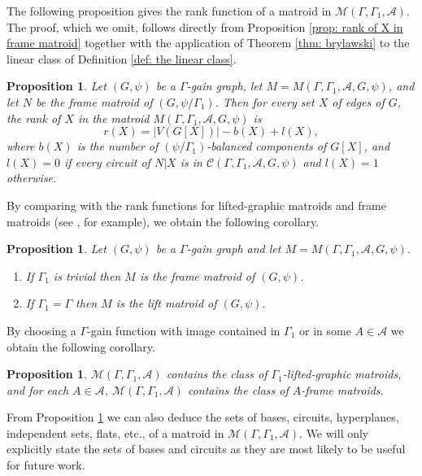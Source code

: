 \documentclass[12pt]{article}
\newtheorem{proposition}[theorem]{Proposition}
\theoremstyle{definition}
\newcommand{\cA}{\mathcal{A}}
\newcommand{\cC}{\mathcal{C}}
\newcommand{\cM}{\mathcal{M}}
\begin{document}
The following proposition gives the rank function of a matroid in $\cM(\Gamma, \Gamma_1, \cA)$.
The proof, which we omit, follows directly from Proposition \ref{prop: rank of X in frame matroid} together with the application of Theorem \ref{thm: brylawski} to the linear class of Definition \ref{def: the linear class}.


\begin{proposition} \label{prop: rank function}
Let $(G, \psi)$ be a $\Gamma$-gain graph, let $M = M(\Gamma, \Gamma_1, \cA, G, \psi)$, and let $N$ be the frame matroid of $(G, \psi/\Gamma_1)$.
Then for every set $X$ of edges of $G$, the rank of $X$ in the matroid $M(\Gamma, \Gamma_1, \cA, G, \psi)$ is
$$r(X) = |V(G[X])| - b(X) + l(X),$$
where $b(X)$ is the number of $(\psi/\Gamma_1)$-balanced components of $G[X]$, and $l(X) = 0$ if every circuit of $N|X$ is in $\cC(\Gamma, \Gamma_1, \cA, G, \psi)$ and $l(X) = 1$ otherwise.
\end{proposition}



By comparing with the rank functions for lifted-graphic matroids and frame matroids (see \cite[page 16]{Bowler-Funk-Slilaty-2020}, for example), we obtain the following corollary.

\begin{proposition} \label{prop: special cases frame and lift matroids}
Let $(G, \psi)$ be a $\Gamma$-gain graph and let $M = M(\Gamma, \Gamma_1, \cA, G, \psi)$.
\begin{enumerate}[label=$(\alph*)$]
\item If $\Gamma_1$ is trivial then $M$ is the frame matroid of $(G, \psi)$.


\item If $\Gamma_1 = \Gamma$ then $M$ is the lift matroid of $(G, \psi)$.
\end{enumerate}
\end{proposition}

By choosing a $\Gamma$-gain function with image contained in $\Gamma_1$ or in some $A \in \cA$ we obtain the following corollary.

\begin{proposition} \label{prop: special cases}
$\cM(\Gamma, \Gamma_1, \cA)$ contains the class of $\Gamma_1$-lifted-graphic matroids, and for each $A \in \cA$, $\cM(\Gamma, \Gamma_1, \cA)$ contains the class of $A$-frame matroids.
\end{proposition}



From Proposition \ref{prop: rank function} we can also deduce the sets of bases, circuits, hyperplanes, independent sets, flats, etc., of a matroid in $\cM(\Gamma, \Gamma_1, \cA)$.
We will only explicitly state the sets of bases and circuits as they are most likely to be useful for future work.
\end{document}
